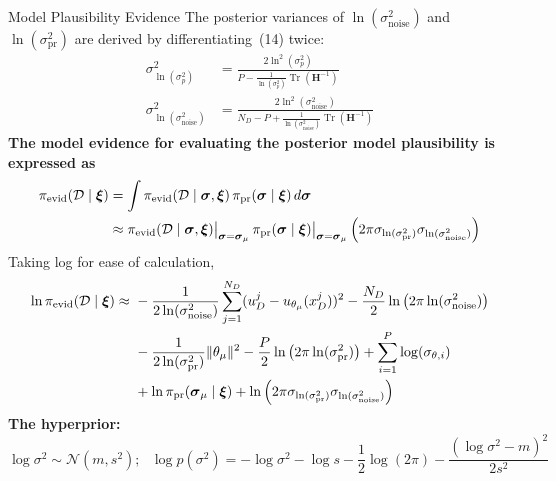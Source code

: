 \documentclass[8pt,xcolor=dvipsnames,compress]{beamer}
\begin{document}
\begin{frame}{Model Plausibility Evidence}
\scriptsize
The posterior variances of $\ln(\sigma_{\mathrm{noise}}^2)$ and $\ln(\sigma_{\mathrm{pr}}^2)$ are derived by differentiating~(14) twice:
\begin{align}
\sigma^2_{\ln(\sigma_p^2)} &= \frac{2 \ln^2(\sigma_p^2)}{P - \frac{1}{\ln(\sigma_p^2)} \operatorname{Tr}(\mathbf{H}^{-1})} \\
\sigma^2_{\ln(\sigma_{\text{noise}}^2)} &= \frac{2 \ln^2(\sigma_{\text{noise}}^2)}{N_D - P + \frac{1}{\ln(\sigma_{\text{noise}}^2)} \operatorname{Tr}(\mathbf{H}^{-1})} 
\end{align}
\textbf{The model evidence for evaluating the posterior model plausibility is expressed as}
\begin{align}
\pi_{\text{evid}}(\mathcal{D} \mid \boldsymbol{\xi}) 
&= \int \pi_{\text{evid}}(\mathcal{D} \mid \boldsymbol{\sigma}, \boldsymbol{\xi}) \, \pi_{\text{pr}}(\boldsymbol{\sigma} \mid \boldsymbol{\xi}) \, d\boldsymbol{\sigma} \notag \\
&\approx \pi_{\text{evid}}(\mathcal{D} \mid \boldsymbol{\sigma}, \boldsymbol{\xi})\big|_{\boldsymbol{\sigma} = \boldsymbol{\sigma}_{\mu}} \, \pi_{\text{pr}}(\boldsymbol{\sigma} \mid \boldsymbol{\xi})\big|_{\boldsymbol{\sigma} = \boldsymbol{\sigma}_{\mu}} \left( 2\pi \sigma_{\ln(\sigma_{\text{pr}}^2)} \sigma_{\ln(\sigma_{\text{noise}}^2)} \right)
\end{align}
Taking log for ease of calculation,
\vspace{-0.1in}
\begin{align}
\ln \pi_{\text{evid}}(\mathcal{D} \mid \boldsymbol{\xi}) \approx \ 
& -\frac{1}{2\ln(\sigma_{\text{noise}}^2)} \sum_{j=1}^{N_D} (u_D^j - u_{\theta_{\mu}}(x_D^j))^2
- \frac{N_D}{2} \ln \left( 2\pi \ln(\sigma_{\text{noise}}^2) \right) \notag\\
& - \frac{1}{2\ln(\sigma_{\text{pr}}^2)} \lVert \theta_{\mu} \rVert^2
- \frac{P}{2} \ln \left( 2\pi \ln(\sigma_{\text{pr}}^2) \right)
+ \sum_{i=1}^{P}\log(\sigma_{\theta,i}) \notag\\
& + \ln \pi_{\text{pr}}(\boldsymbol{\sigma}_{\mu} \mid \boldsymbol{\xi})
+ \ln \left( 2\pi \sigma_{\ln(\sigma_{\text{pr}}^2)} \sigma_{\ln(\sigma_{\text{noise}}^2)} \right)
\end{align}
\vspace{-0.15in}
\textbf{The hyperprior:}
\[
\log \sigma^2 \sim \mathcal{N}(m, s^2); \text{ }
\log p(\sigma^2) = -\log \sigma^2 - \log s - \frac{1}{2}\log(2\pi) - \frac{(\log \sigma^2 - m)^2}{2s^2}
\]

\end{frame}
\end{document}
